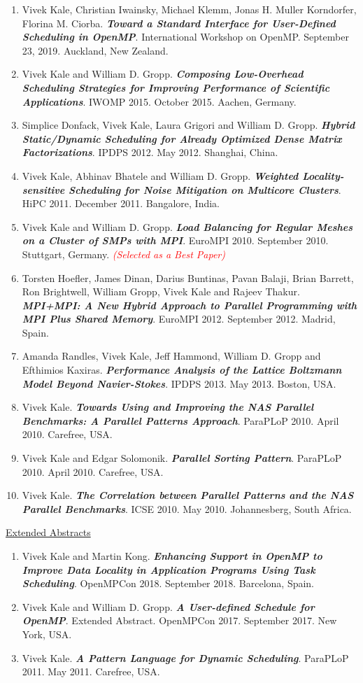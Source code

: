 \begin{enumerate}
\item Vivek Kale, Christian Iwainsky, Michael Klemm, Jonas H. Muller Korndorfer, Florina M. Ciorba. \textbf{\textit{Toward a Standard Interface for User-Defined Scheduling in OpenMP}}. International Workshop on OpenMP. September 23, 2019. Auckland, New Zealand. 
\item Vivek Kale and William D. Gropp. \textbf{\textit{Composing Low-Overhead Scheduling Strategies for Improving Performance of Scientific Applications}}. IWOMP 2015. October 2015. Aachen, Germany.
\item Simplice Donfack, Vivek Kale, Laura Grigori and William D. Gropp. \textbf{\textit{Hybrid Static/Dynamic Scheduling for Already Optimized Dense Matrix Factorizations}}. IPDPS 2012. May 2012. Shanghai, China.
\item Vivek Kale, Abhinav Bhatele and William D. Gropp. \textbf{\textit{Weighted Locality-sensitive Scheduling for
      Noise Mitigation on Multicore Clusters}}. HiPC 2011. December
  2011. Bangalore, India. 
\item Vivek Kale and William D. Gropp. \textbf{\textit{Load Balancing for Regular Meshes on a Cluster of SMPs with MPI}}. EuroMPI 2010. September 2010. Stuttgart, Germany. \textit{\textcolor{red}{(Selected as a Best Paper)}}
\item Torsten Hoefler, James Dinan, Darius Buntinas, Pavan Balaji, Brian Barrett, Ron Brightwell, William Gropp, Vivek Kale and Rajeev Thakur. \textbf{\textit{MPI+MPI: A New Hybrid Approach to Parallel Programming with MPI Plus Shared Memory}}. EuroMPI 2012. September 2012. Madrid, Spain.
\item Amanda Randles, Vivek Kale, Jeff Hammond, William D. Gropp and Efthimios Kaxiras. \textbf{\textit{Performance Analysis of the Lattice
Boltzmann Model Beyond Navier-Stokes}}. IPDPS 2013. May 2013. Boston, USA.
\item Vivek Kale. \textbf{\textit{Towards Using and Improving the NAS Parallel Benchmarks: A Parallel Patterns Approach}}. ParaPLoP 2010. April 2010. Carefree, USA.
\item Vivek Kale and Edgar Solomonik. \textbf{\textit{Parallel Sorting Pattern}}. ParaPLoP 2010. April 2010. Carefree, USA. 
\item Vivek Kale. \textbf{\textit{The Correlation between Parallel Patterns and the NAS Parallel Benchmarks}}. ICSE 2010. May 2010. Johannesberg, South Africa.
\end{enumerate} 

\underline{Extended Abstracts}
\begin{enumerate}
\item Vivek Kale and Martin Kong. \textbf{\textit{Enhancing Support in OpenMP to Improve Data Locality in Application Programs Using Task Scheduling}}. OpenMPCon 2018. September 2018. Barcelona, Spain.
\item Vivek Kale and William D. Gropp. \textbf{\textit{A User-defined Schedule for OpenMP}}. Extended Abstract. OpenMPCon
  2017. September 2017. New York, USA.
\item Vivek Kale. \textbf{\textit{A Pattern Language for Dynamic Scheduling}}. ParaPLoP 2011. May 2011. Carefree, USA.
\end{enumerate}

